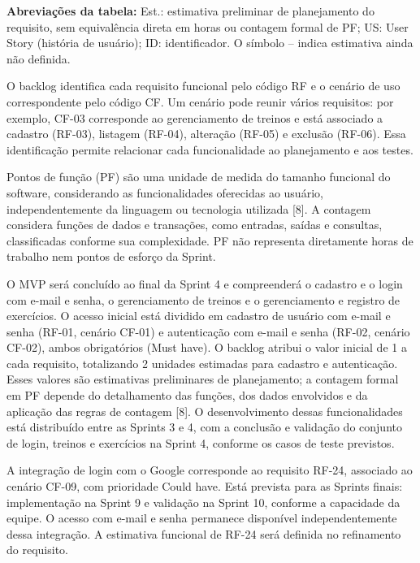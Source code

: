 \noindent\textbf{Abreviações da tabela:} Est.: estimativa preliminar de planejamento do requisito, sem equivalência direta em horas ou contagem formal de PF; US: User Story (história de usuário); ID: identificador. O símbolo -- indica estimativa ainda não definida.

O backlog identifica cada requisito funcional pelo código RF e o cenário de uso correspondente pelo código CF. Um cenário pode reunir vários requisitos: por exemplo, CF-03 corresponde ao gerenciamento de treinos e está associado a cadastro (RF-03), listagem (RF-04), alteração (RF-05) e exclusão (RF-06). Essa identificação permite relacionar cada funcionalidade ao planejamento e aos testes.

Pontos de função (PF) são uma unidade de medida do tamanho funcional do software, considerando as funcionalidades oferecidas ao usuário, independentemente da linguagem ou tecnologia utilizada [8]. A contagem considera funções de dados e transações, como entradas, saídas e consultas, classificadas conforme sua complexidade. PF não representa diretamente horas de trabalho nem pontos de esforço da Sprint.

O MVP será concluído ao final da Sprint 4 e compreenderá o cadastro e o login com e-mail e senha, o gerenciamento de treinos e o gerenciamento e registro de exercícios. O acesso inicial está dividido em cadastro de usuário com e-mail e senha (RF-01, cenário CF-01) e autenticação com e-mail e senha (RF-02, cenário CF-02), ambos obrigatórios (Must have). O backlog atribui o valor inicial de 1 a cada requisito, totalizando 2 unidades estimadas para cadastro e autenticação. Esses valores são estimativas preliminares de planejamento; a contagem formal em PF depende do detalhamento das funções, dos dados envolvidos e da aplicação das regras de contagem [8]. O desenvolvimento dessas funcionalidades está distribuído entre as Sprints 3 e 4, com a conclusão e validação do conjunto de login, treinos e exercícios na Sprint 4, conforme os casos de teste previstos.

A integração de login com o Google corresponde ao requisito RF-24, associado ao cenário CF-09, com prioridade Could have. Está prevista para as Sprints finais: implementação na Sprint 9 e validação na Sprint 10, conforme a capacidade da equipe. O acesso com e-mail e senha permanece disponível independentemente dessa integração. A estimativa funcional de RF-24 será definida no refinamento do requisito.

